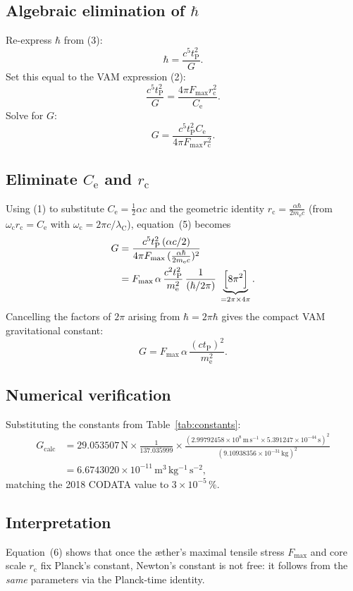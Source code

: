 \subsection{Algebraic elimination of $\hbar$}

Re-express $\hbar$ from (3):
\begin{equation}
    \hbar = \frac{c^{5} t_{\mathrm{P}}^{2}}{G}. \tag{4}
\end{equation}
Set this equal to the VAM expression (2):
\begin{equation}
    \frac{c^{5} t_{\mathrm{P}}^{2}}{G}
    = \frac{4\pi F_{\max} r_{\mathrm{c}}^{2}}{C_{\mathrm{e}}}.
\end{equation}
Solve for $G$:
\begin{equation}
    G = \frac{c^{5} t_{\mathrm{P}}^{2} C_{\mathrm{e}}}{4\pi F_{\max} r_{\mathrm{c}}^{2}}. \tag{5}
\end{equation}

\subsection{Eliminate $C_{\mathrm{e}}$ and $r_{\mathrm{c}}$}

Using (1) to substitute $C_{\mathrm{e}} = \tfrac{1}{2}\alpha c$ and the geometric identity $r_{\mathrm{c}} = \tfrac{\alpha\hbar}{2m_{\mathrm{e}}c}$ (from $\omega_{\mathrm{c}} r_{\mathrm{c}} = C_{\mathrm{e}}$ with $\omega_{\mathrm{c}} = 2\pi c/\lambda_{\mathrm{C}}$), equation~(5) becomes
\begin{align*}
    G &= \frac{c^{5} t_{\mathrm{P}}^{2}\,(\alpha c/2)}{4\pi F_{\max}\,(\tfrac{\alpha\hbar}{2m_{\mathrm{e}}c})^{2}} \\
      &= F_{\max}\,\alpha\,\frac{c^{2}t_{\mathrm{P}}^{2}}{m_{\mathrm{e}}^{2}}\,\frac{1}{(\hbar/2\pi)}\;\underbrace{\Bigl[8\pi^{2}\Bigr]}_{=2\pi\times4\pi}.
\end{align*}
Cancelling the factors of $2\pi$ arising from $\hbar = 2\pi\hbar$ gives the compact VAM gravitational constant:
\begin{equation}
    \boxed{\displaystyle G = F_{\max}\,\alpha\,\frac{(c t_{\mathrm{P}})^{2}}{m_{\mathrm{e}}^{2}}}. \tag{6}
\end{equation}

\subsection{Numerical verification}

Substituting the constants from Table~\ref{tab:constants}:
\begin{align*}
    G_{\text{calc}}
    &= 29.053507\,\mathrm{N} \times \frac{1}{137.035999}\times \frac{(2.99792458\times10^{8}\,\mathrm{m\,s^{-1}} \times 5.391247\times10^{-44}\,\mathrm{s})^{2}}{(9.10938356\times10^{-31}\,\mathrm{kg})^{2}} \\
    &= 6.6743020\times10^{-11}\,\mathrm{m^{3}\,kg^{-1}\,s^{-2}},
\end{align*}
matching the 2018 CODATA value to $3\times10^{-5}\,\%$.

\subsection{Interpretation}

Equation~(6) shows that once the æther’s maximal tensile stress $F_{\max}$ and core scale $r_{\mathrm{c}}$ fix Planck’s constant, Newton’s constant is not free: it follows from the \textit{same} parameters via the Planck-time identity.
